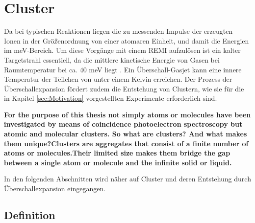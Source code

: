 \newpage
\section{Cluster} \label{sec:Cluster}

Da bei typischen Reaktionen liegen die zu messenden Impulse der erzeugten Ionen in der Größenordnung von einer atomaren Einheit, und damit die Energien im meV-Bereich. Um diese Vorgänge mit einem REMI aufzulösen ist ein kalter Targetstrahl essentiell, da die mittlere kinetische Energie von Gasen bei Raumtemperatur bei ca. 40 meV liegt \cite{kurka07}. Ein Überschall-Gasjet kann eine innere Temperatur der Teilchen von unter einem Kelvin erreichen. Der Prozess der Überschallexpansion fördert zudem die Entstehung von Clustern, wie sie für die in Kapitel \ref{sec:Motivation} vorgestellten Experimente erforderlich sind.

\textbf{For the purpose of this thesis not simply atoms or molecules have been investigated by means of coincidence photoelectron spectroscopy but atomic and molecular clusters. So what are clusters? And what makes them unique?Clusters are aggregates that consist of a finite number of atoms or molecules.Their limited size makes them bridge the gap between a single atom or molecule
and the infinite solid or liquid.}

In den folgenden Abschnitten wird näher auf Cluster und deren Entstehung durch Überschallexpansion eingegangen.


\subsection{Definition}

